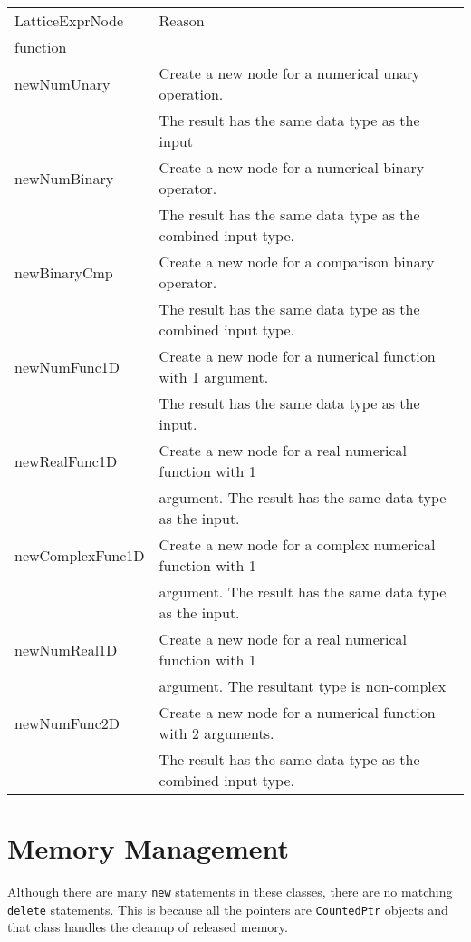\begin{center}
\begin{tabular}{|l|l}
\hline
LatticeExprNode &  Reason \\
  function      & \\
\hline
newNumUnary  &     Create a new node for a numerical unary operation. \\
&                  The result has the same data type as the input \\
newNumBinary &     Create a new node for a numerical binary operator.  \\
             &    The result has the same data type as the combined input type. \\
newBinaryCmp &    Create a new node for a comparison binary operator. \\
             &     The result has the same data type as the combined input type. \\
newNumFunc1D  &    Create a new node for a numerical function with 1 argument. \\
              &   The result has the same data type as the input. \\
newRealFunc1D  &   Create a new node for a real numerical function with 1 \\
               &  argument. The result has the same data type as the input. \\
newComplexFunc1D &  Create a new node for a complex numerical function with 1 \\
                 &  argument. The result has the same data type as the input. \\
newNumReal1D     & Create a new node for a real numerical function with 1 \\
                 &  argument. The resultant type is non-complex \\
newNumFunc2D     & Create a new node for a numerical function with 2 arguments. \\
                 & The result has the same data type as the combined input type. \\
\hline
\end{tabular}
\end{center}

\section {Memory Management}

Although there are many {\tt new} statements in these classes, there are
no matching {\tt delete} statements.  This is because all the pointers
are {\tt CountedPtr} objects and that class handles the cleanup of
released memory. 




